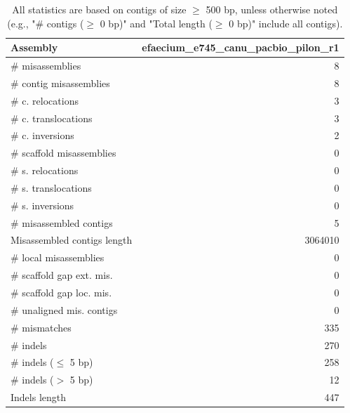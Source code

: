 \documentclass[12pt,a4paper]{article}
\begin{document}
\begin{table}[ht]
\begin{center}
\caption{All statistics are based on contigs of size $\geq$ 500 bp, unless otherwise noted (e.g., "\# contigs ($\geq$ 0 bp)" and "Total length ($\geq$ 0 bp)" include all contigs).}
\begin{tabular}{|l*{1}{|r}|}
\hline
Assembly & efaecium\_e745\_canu\_pacbio\_pilon\_r1 \\ \hline
\# misassemblies & 8 \\ \hline
\hspace{2mm}\# contig misassemblies & 8 \\ \hline
\hspace{5mm}\# c. relocations & 3 \\ \hline
\hspace{5mm}\# c. translocations & 3 \\ \hline
\hspace{5mm}\# c. inversions & 2 \\ \hline
\hspace{2mm}\# scaffold misassemblies & 0 \\ \hline
\hspace{5mm}\# s. relocations & 0 \\ \hline
\hspace{5mm}\# s. translocations & 0 \\ \hline
\hspace{5mm}\# s. inversions & 0 \\ \hline
\# misassembled contigs & 5 \\ \hline
Misassembled contigs length & 3064010 \\ \hline
\# local misassemblies & 0 \\ \hline
\# scaffold gap ext. mis. & 0 \\ \hline
\# scaffold gap loc. mis. & 0 \\ \hline
\# unaligned mis. contigs & 0 \\ \hline
\# mismatches & 335 \\ \hline
\# indels & 270 \\ \hline
\hspace{5mm}\# indels ($\leq$ 5 bp) & 258 \\ \hline
\hspace{5mm}\# indels ($>$ 5 bp) & 12 \\ \hline
Indels length & 447 \\ \hline
\end{tabular}
\end{center}
\end{table}
\end{document}

